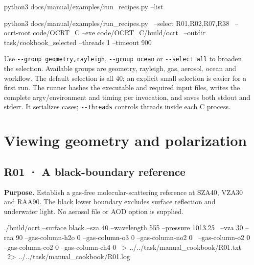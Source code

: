 \noindent\begin{minipage}{\linewidth}
\begin{ManualCode}

python3 docs/manual/examples/run_recipes.py --list

python3 docs/manual/examples/run_recipes.py \
  --select R01,R02,R07,R38 \
  --ocrt-root code/OCRT_C --exe code/OCRT_C/build/ocrt \
  --outdir task/cookbook_selected --threads 1 --timeout 900

\end{ManualCode}
\end{minipage}\par

Use \texttt{-\allowbreak{}-\allowbreak{}group geometry,rayleigh}, \texttt{-\allowbreak{}-\allowbreak{}group ocean} or \texttt{-\allowbreak{}-\allowbreak{}select all} to broaden the selection. Available groups are geometry, rayleigh, gas, aerosol, ocean and workflow. The default selection is all 40; an explicit small selection is easier for a first run. The runner hashes the executable and required input files, writes the complete argv/environment and timing per invocation, and saves both stdout and stderr. It serializes cases; \texttt{-\allowbreak{}-\allowbreak{}threads} controls threads inside each C process.

\section{Viewing geometry and polarization}
\label{sec:auto:09_cookbook:2}

\Needspace{17\baselineskip}

\subsection{R01 · A black-boundary reference}
\label{sec:auto:09_cookbook:2.1}

\label{recipe:R01}

\textbf{Purpose. }Establish a gas-free molecular-scattering reference at SZA40\textdegree{}, VZA30\textdegree{} and RAA90\textdegree{}. The black lower boundary excludes surface reflection and underwater light. No aerosol file or AOD option is supplied.

\noindent\begin{minipage}{\linewidth}
\begin{ManualCode}

./build/ocrt --surface black --sza 40 --wavelength 555 --pressure 1013.25 \
  --vza 30 --raa 90 --gas-column-h2o 0 --gas-column-o3 0 --gas-column-no2 0 \
  --gas-column-o2 0 --gas-column-co2 0 --gas-column-ch4 0 \
  > ../../task/manual_cookbook/R01.txt \
  2> ../../task/manual_cookbook/R01.log

\end{ManualCode}
\end{minipage}\par

